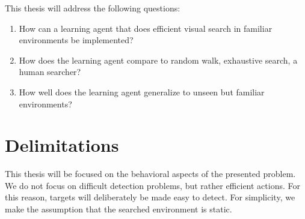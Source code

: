 This thesis will address the following questions:

\begin{enumerate}
  \item \label{itm:rq1} How can a learning agent that does efficient visual search in familiar environments be implemented?
  \item \label{itm:rq2} How does the learning agent compare to random walk, exhaustive search, a human searcher?
  \item \label{itm:rq3} How well does the learning agent generalize to unseen but familiar environments?
\end{enumerate}

\section{Delimitations}
\label{sec:delimitations}


This thesis will be focused on the behavioral aspects of the presented problem.
We do not focus on difficult detection problems, but rather efficient actions.
For this reason, targets will deliberately be made easy to detect.
For simplicity, we make the assumption that the searched environment is static. %

